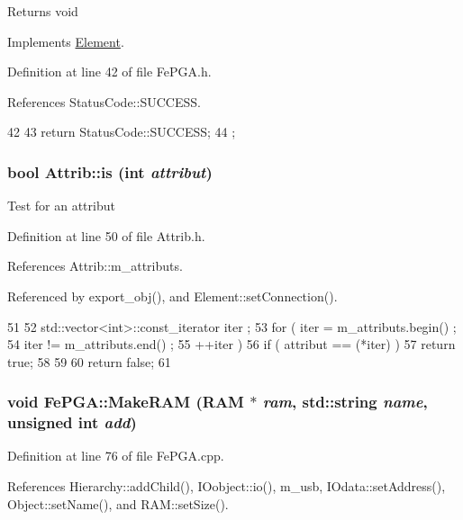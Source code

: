 \begin{DoxyReturn}{Returns}
void 
\end{DoxyReturn}


Implements \hyperlink{classElement_af42754b5cabc198869222725218d695c}{Element}.

Definition at line 42 of file FePGA.h.

References StatusCode::SUCCESS.


\begin{DoxyCode}
42                     {
43     return StatusCode::SUCCESS;
44   };
\end{DoxyCode}
\hypertarget{classAttrib_a704f26af560909ad22065083bb7d4c34}{
\subsubsection[{is}]{\setlength{\rightskip}{0pt plus 5cm}bool Attrib::is (int {\em attribut})}}
\label{classAttrib_a704f26af560909ad22065083bb7d4c34}
Test for an attribut 

Definition at line 50 of file Attrib.h.

References Attrib::m\_\-attributs.

Referenced by export\_\-obj(), and Element::setConnection().


\begin{DoxyCode}
51   {
52     std::vector<int>::const_iterator iter ;
53     for ( iter  = m_attributs.begin() ;
54           iter != m_attributs.end()   ;
55           ++iter ) {
56       if ( attribut == (*iter) ) {
57         return true;
58       }
59     }
60     return false;
61   }
\end{DoxyCode}
\hypertarget{classFePGA_ac3af50fbe7f8f7a8c6adbcb164cbbf47}{
\subsubsection[{MakeRAM}]{\setlength{\rightskip}{0pt plus 5cm}void FePGA::MakeRAM ({\bf RAM} $\ast$ {\em ram}, \/  std::string {\em name}, \/  unsigned int {\em add})}}
\label{classFePGA_ac3af50fbe7f8f7a8c6adbcb164cbbf47}


Definition at line 76 of file FePGA.cpp.

References Hierarchy::addChild(), IOobject::io(), m\_\-usb, IOdata::setAddress(), Object::setName(), and RAM::setSize().

